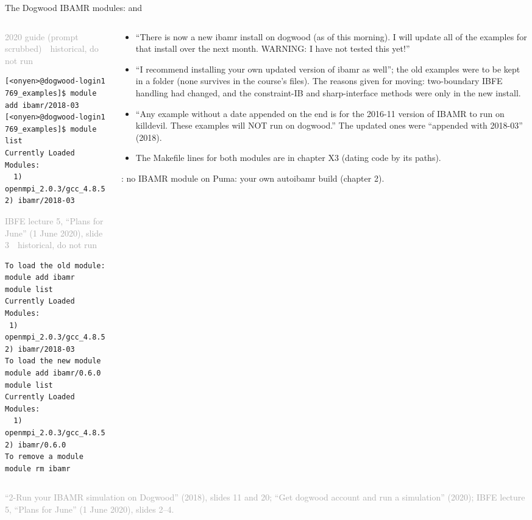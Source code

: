 \documentclass[aspectratio=169,11pt]{beamer}
\newcommand{\sourcecredit}[1]{\vfill\begin{flushright}\tiny\textcolor{DarkGray}{#1}\end{flushright}}
\newcommand{\hist}[1]{{\tiny\sffamily\textcolor{DarkGray}{#1\ \textbullet\ historical, do not run}}\par\nointerlineskip\vspace{0.3mm}}
\begin{document}
\begin{frame}[fragile]{The Dogwood IBAMR modules:  and }
\label{fr:dwmodules}
\begin{columns}[T,onlytextwidth]
\begin{column}{0.5\textwidth}
\hist{2020 guide (prompt scrubbed)}
\begin{lstlisting}[style=hist]
[<onyen>@dogwood-login1 769_examples]$ module add ibamr/2018-03
[<onyen>@dogwood-login1 769_examples]$ module list
Currently Loaded Modules:
  1) openmpi_2.0.3/gcc_4.8.5   2) ibamr/2018-03
\end{lstlisting}
\hist{IBFE lecture 5, ``Plans for June'' (1 June 2020), slide 3}
\begin{lstlisting}[style=hist]
To load the old module:
module add ibamr
module list
Currently Loaded Modules:
 1) openmpi_2.0.3/gcc_4.8.5   2) ibamr/2018-03
To load the new module
module add ibamr/0.6.0
module list
Currently Loaded Modules:
  1) openmpi_2.0.3/gcc_4.8.5   2) ibamr/0.6.0
To remove a module
module rm ibamr
\end{lstlisting}
\end{column}
\begin{column}{0.47\textwidth}
\scriptsize
\begin{itemize}\setlength{\itemsep}{2pt}
  \item ``There is now a new ibamr install on dogwood (as of this morning). I will update all of the examples for that install over the next month. WARNING: I have not tested this yet!''
  \item ``I recommend installing your own updated version of ibamr as well''; the old examples were to be kept in a folder  (none survives in the course's files). The reasons given for moving: two-boundary IBFE handling had changed, and the constraint-IB and sharp-interface methods were only in the new install.
  \item ``Any example without a date appended on the end is for the 2016-11 version of IBAMR to run on killdevil. These examples will NOT run on dogwood.'' The updated ones were ``appended with 2018-03'' (2018).
  \item The Makefile lines for both modules are in chapter X3 (dating code by its paths).
\end{itemize}
\vspace{1mm}
: no IBAMR module on Puma: your own autoibamr build (chapter 2).
\end{column}
\end{columns}
\sourcecredit{``2-Run your IBAMR simulation on Dogwood'' (2018), slides 11 and 20; ``Get dogwood account and run a simulation'' (2020); IBFE lecture 5, ``Plans for June'' (1 June 2020), slides 2--4.}
\end{frame}
\end{document}
